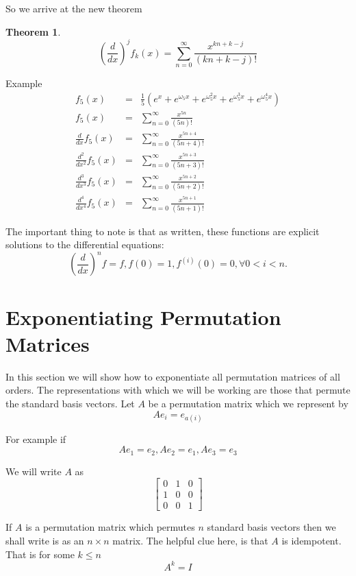 \documentclass{amsart}
\newtheorem{thm}{Theorem}
\theoremstyle{definition}
\theoremstyle{remark}
\numberwithin{equation}{section}
\begin{document}
So we arrive at the new theorem

\begin{thm}
\begin{equation}
\left(\frac{d}{dx}\right)^j f_k(x) = \sum_{n=0}^{\infty} \frac{x^{kn+k-j}}{(kn+k-j)!}
\end{equation}
\end{thm}

Example
\begin{eqnarray}
f_5(x) & = & \frac{1}{5}(e^{x}+e^{\omega_5 x} + e^{\omega_5^2 x} + e^{\omega_5^3 x}+e^{\omega_5^4 x})\nonumber\\
f_5(x) & = & \sum_{n=0}^{\infty} \frac{x^{5n}}{(5n)!}\nonumber
\\
\frac{d}{dx} f_5(x) & = & \sum_{n=0}^{\infty} \frac{x^{5n+4}}{(5n+4)!}\nonumber\\
\frac{d^2}{dx^2} f_5(x) & = & \sum_{n=0}^{\infty} \frac{x^{5n+3}}{(5n+3)!}\nonumber\\
\frac{d^3}{dx^3} f_5(x) & = & \sum_{n=0}^{\infty} \frac{x^{5n+2}}{(5n+2)!}\nonumber\\
\frac{d^4}{dx ^4} f_5(x) & = & \sum_{n=0}^{\infty} \frac{x^{5n+1}}{(5n+1)!}
\end{eqnarray}



The important thing to note is that as written, these functions are explicit solutions to the differential equations:
\[
\left(\frac{d}{dx}\right)^n f = f, f(0)=1,f^{(i)}(0)=0, \forall 0 < i < n.
\]


\section{Exponentiating Permutation Matrices}


In this section we will show how to exponentiate all permutation matrices of all orders.  The representations with which we will be working are those that permute the standard basis vectors.  Let $A$ be a permutation matrix which we represent by
\[
A e_{i} = e_{a(i)}
\]

For example if 
\[
Ae_1 = e_2, A e_2 = e_1, A e_3 = e_3 
\]

We will write $A$ as
\[
\begin{bmatrix}
0 & 1 & 0 \\
1 & 0 & 0 \\
0 & 0  & 1
\end{bmatrix}
\]


If $A$ is a permutation matrix which permutes $n$ standard basis vectors then we shall write is as an $n\times n$ matrix.  The helpful clue here, is that $A$ is idempotent.  That is for some $k\le n$
\[
A^k = I
\]
\end{document}
